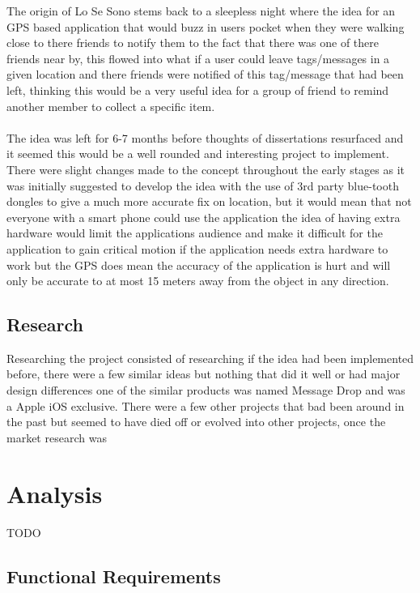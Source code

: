 The origin of Lo Se Sono stems back to a sleepless night where the idea for an GPS based application that would buzz in users pocket when they were walking close to there friends to notify them to the fact that there was one of there friends near by, this flowed into what if a user could leave tags/messages in a given location and there friends were notified of this tag/message that had been left, thinking this would be a very useful idea for a group of friend to remind another member to collect a specific item.\\
\\
The idea was left for 6-7 months before thoughts of dissertations resurfaced and it seemed this would be a well rounded and interesting project to implement. There were slight changes made to the concept throughout the early stages as it was initially suggested to develop the idea with the use of 3rd party blue-tooth dongles to give a much more accurate fix on location, but it would mean that not everyone with a smart phone could use the application the idea of having extra hardware would limit the applications audience and make it difficult for the application to gain critical motion if the application needs extra hardware to work but the GPS does mean the accuracy of the application is hurt and will only be accurate to at most 15 meters away from the object in any direction.

\subsection{Research}

Researching the project consisted of researching if the idea had been implemented before, there were a few similar ideas but nothing that did it well or had major design differences one of the similar products was named Message Drop \cite{dmt:dropmessageteam:2015:online} and was a Apple iOS exclusive. There were a few other projects that bad been around in the past but seemed to have died off or evolved into other projects, once the market research was 


\section{Analysis}

{TODO}

\subsection{Functional Requirements}

